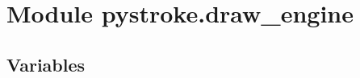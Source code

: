 %
%
%


\section{Module pystroke.draw\_engine}

    \label{pystroke:draw_engine}


  \subsection{Variables}

